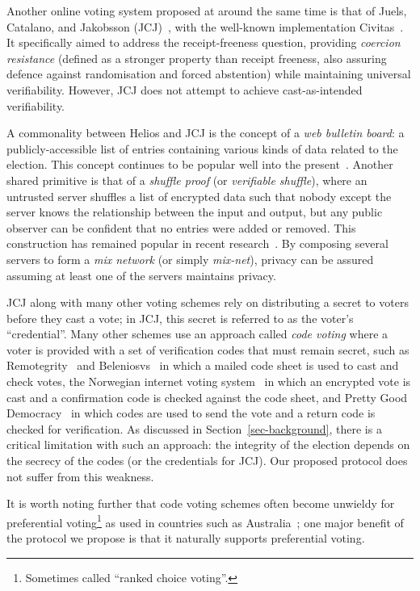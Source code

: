 \documentclass[12pt,a4paper]{article}
\theoremstyle{definition}
\begin{document}
Another online voting system proposed at around the same time is that of Juels, Catalano, and Jakobsson (JCJ)~\cite{juels2010coercion}, with the well-known implementation Civitas~\cite{clarkson2008civitas}. It specifically aimed to address the receipt-freeness question, providing \textit{coercion resistance} (defined as a stronger property than receipt freeness, also assuring defence against randomisation and forced abstention) while maintaining universal verifiability. However, JCJ does not attempt to achieve cast-as-intended verifiability.

A commonality between Helios and JCJ is the concept of a \textit{web bulletin board}: a publicly-accessible list of entries containing various kinds of data related to the election. This concept continues to be popular well into the present~\cite{kiayias2018security}. Another shared primitive is that of a \textit{shuffle proof} (or \textit{verifiable shuffle}), where an untrusted server shuffles a list of encrypted data such that nobody except the server knows the relationship between the input and output, but any public observer can be confident that no entries were added or removed. This construction has remained popular in recent research~\cite{cortier2017machine}. By composing several servers to form a \textit{mix network} (or simply \textit{mix-net}), privacy can be assured assuming at least one of the servers maintains privacy.

JCJ along with many other voting schemes rely on distributing a secret to voters before they cast a vote; in JCJ, this secret is referred to as the voter's ``credential''. Many other schemes use an approach called \textit{code voting} where a voter is provided with a set of verification codes that must remain secret, such as Remotegrity~\cite{zagorski2013remotegrity} and Beleniosvs~\cite{cortier2019beleniosvs} in which a mailed code sheet is used to cast and check votes, the Norwegian internet voting system~\cite{gjosteen2011norwegian} in which an encrypted vote is cast and a confirmation code is checked against the code sheet, and Pretty Good Democracy~\cite{ryan2009pretty} in which codes are used to send the vote and a return code is checked for verification. As discussed in Section~\ref{sec-background}, there is a critical limitation with such an approach: the integrity of the election depends on the secrecy of the codes (or the credentials for JCJ). Our proposed protocol does not suffer from this weakness.

It is worth noting further that code voting schemes often become unwieldy for preferential voting\footnote{Sometimes called ``ranked choice voting''.} as used in countries such as Australia~\cite{aditya2003secure}; one major benefit of the protocol we propose is that it naturally supports preferential voting.
\end{document}
